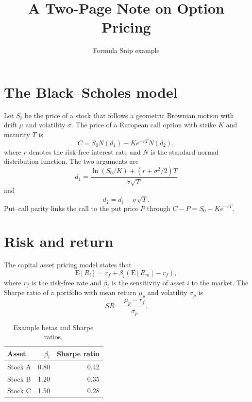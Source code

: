 \documentclass[11pt]{article}
\title{A Two-Page Note on Option Pricing}
\author{Formula Snip example}
\date{}
\begin{document}
\maketitle

\section{The Black--Scholes model}

Let $S_t$ be the price of a stock that follows a geometric Brownian motion with drift $\mu$
and volatility $\sigma$. The price of a European call option with strike $K$ and maturity $T$ is
\begin{equation}
  C = S_0 N(d_1) - K e^{-rT} N(d_2),
  \label{eq:bs}
\end{equation}
where $r$ denotes the risk-free interest rate and $N$ is the standard normal distribution function.
The two arguments are
\begin{equation}
  d_1 = \frac{\ln(S_0/K) + (r + \sigma^2/2)T}{\sigma\sqrt{T}}
\end{equation}
and
\begin{equation}
  d_2 = d_1 - \sigma\sqrt{T}.
\end{equation}
Put--call parity links the call to the put price $P$ through $C - P = S_0 - K e^{-rT}$.

\section{Risk and return}

The capital asset pricing model states that
\begin{equation}
  \mathrm{E}[R_i] = r_f + \beta_i \left( \mathrm{E}[R_m] - r_f \right),
\end{equation}
where $r_f$ is the risk-free rate and $\beta_i$ is the sensitivity of asset $i$ to the market.
The Sharpe ratio of a portfolio with mean return $\mu_p$ and volatility $\sigma_p$ is
\begin{equation}
  SR = \frac{\mu_p - r_f}{\sigma_p}.
\end{equation}

\begin{table}[h]
\centering
\begin{tabular}{lrr}
\toprule
Asset & $\beta_i$ & Sharpe ratio \\
\midrule
Stock A & 0.80 & 0.42 \\
Stock B & 1.20 & 0.35 \\
Stock C & 1.50 & 0.28 \\
\bottomrule
\end{tabular}
\caption{Example betas and Sharpe ratios.}
\end{table}
\end{document}
